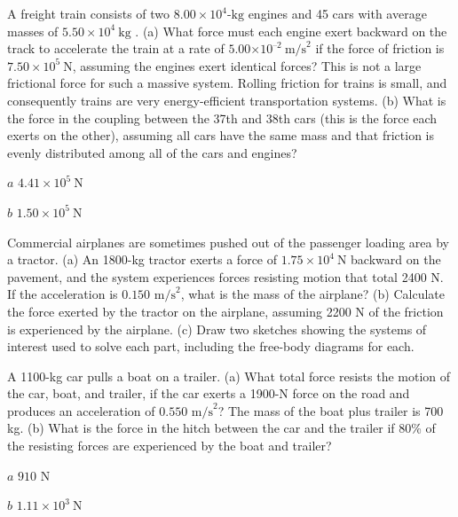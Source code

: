 \documentclass[
]{book}
\newenvironment{problems-exercises}{}{}
\begin{document}
\begin{problems-exercises}
\hypertarget{fs-id666647}{}
\leavevmode\hypertarget{fs-id1730999}{}%
A freight train consists of two \(8.00 \times 10^{4}\text{-kg}\) engines
and 45 cars with average masses of \(5.50 \times 10^{4}\ \text{kg}\) . (a)
What force must each engine exert backward on the track to accelerate
the train at a rate of
\({5.00{\times \text{10}^{\text{–2}}}\ \text{m/s}^{2}}{}\) if the force of
friction is \({7\text{.}{\text{50} \times \text{10}^{5}}\ \text{N}}{}\),
assuming the engines exert identical forces? This is not a large
frictional force for such a massive system. Rolling friction for trains
is small, and consequently trains are very energy-efficient
transportation systems. (b) What is the force in the coupling between
the 37th and 38th cars (this is the force each exerts on the other),
assuming all cars have the same mass and that friction is evenly
distributed among all of the cars and engines?

\leavevmode\hypertarget{fs-id2331892}{}%
\(a\) \({4\text{.}{\text{41} \times \text{10}^{5}}\ \text{N}}{}\)

\(b\) \({1\text{.}{\text{50} \times \text{10}^{5}}\ \text{N}}{}\)

\hypertarget{fs-id1662012}{}
\leavevmode\hypertarget{fs-id1481440}{}%
Commercial airplanes are sometimes pushed out of the passenger loading
area by a tractor. (a) An 1800-kg tractor exerts a force of
\({1\text{.}{\text{75} \times \text{10}^{4}}\ \text{N}}{}\) backward on
the pavement, and the system experiences forces resisting motion that
total 2400 N. If the acceleration is \({0\text{.}\text{150\ m/s}^{2}}{}\),
what is the mass of the airplane? (b) Calculate the force exerted by the
tractor on the airplane, assuming 2200 N of the friction is experienced
by the airplane. (c) Draw two sketches showing the systems of interest
used to solve each part, including the free-body diagrams for each.

\hypertarget{fs-id1673888}{}
\leavevmode\hypertarget{fs-id2097453}{}%
A 1100-kg car pulls a boat on a trailer. (a) What total force resists
the motion of the car, boat, and trailer, if the car exerts a 1900-N
force on the road and produces an acceleration of
\({0\text{.}\text{550\ m/s}^{2}}{}\)? The mass of the boat plus trailer is
700 kg. (b) What is the force in the hitch between the car and the
trailer if 80\% of the resisting forces are experienced by the boat and
trailer?

\leavevmode\hypertarget{fs-id1556049}{}%
\(a\) \(\text{910\ N}{}\)

\(b\) \({1\text{.}{\text{11} \times \text{10}^{3}}\ \text{N}}{}\)


\end{problems-exercises}
\end{document}
